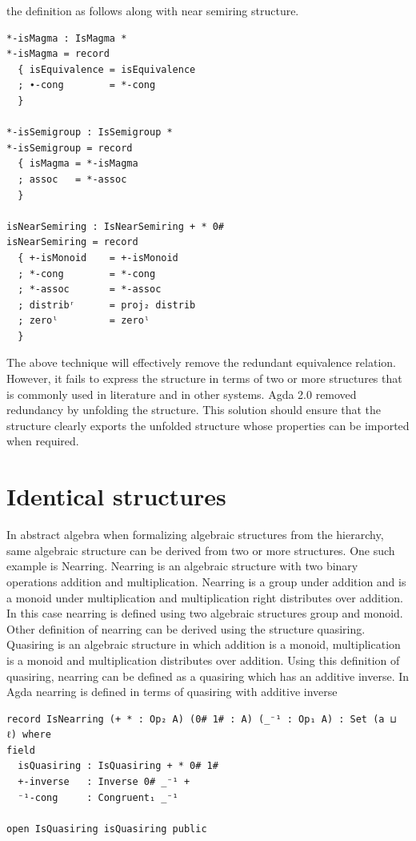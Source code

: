 the definition as follows along with near semiring structure.
\begin{verbatim}
*-isMagma : IsMagma *
*-isMagma = record
  { isEquivalence = isEquivalence
  ; ∙-cong        = *-cong
  }

*-isSemigroup : IsSemigroup *
*-isSemigroup = record
  { isMagma = *-isMagma
  ; assoc   = *-assoc
  }

isNearSemiring : IsNearSemiring + * 0#
isNearSemiring = record
  { +-isMonoid    = +-isMonoid
  ; *-cong        = *-cong
  ; *-assoc       = *-assoc
  ; distribʳ      = proj₂ distrib
  ; zeroˡ         = zeroˡ
  }
\end{verbatim}
The above technique will effectively remove the redundant equivalence relation.
However, it fails to express the structure in terms of two or more structures
that is commonly used in literature and in other systems. Agda 2.0 removed
redundancy by unfolding the structure. This solution should ensure that the
structure clearly exports the unfolded structure whose properties can be
imported when required.

\section{Identical structures}
In abstract algebra when formalizing algebraic structures from the hierarchy,
same algebraic structure can be derived from two or more structures. One such
example is Nearring. Nearring is an algebraic structure with two binary
operations addition and multiplication. Nearring is a group under addition and
is a monoid under multiplication and multiplication right distributes over
addition. In this case nearring is defined using two algebraic structures group
and monoid. Other definition of nearring can be derived using the structure
quasiring. Quasiring is an algebraic structure in which addition is a monoid,
multiplication is a monoid and multiplication distributes over addition. Using
this definition of quasiring, nearring can be defined as a quasiring which has
an additive inverse. In Agda nearring is defined in terms of quasiring with
additive inverse 

\begin{verbatim}
record IsNearring (+ * : Op₂ A) (0# 1# : A) (_⁻¹ : Op₁ A) : Set (a ⊔ ℓ) where
field
  isQuasiring : IsQuasiring + * 0# 1#
  +-inverse   : Inverse 0# _⁻¹ +
  ⁻¹-cong     : Congruent₁ _⁻¹

open IsQuasiring isQuasiring public
\end{verbatim}

